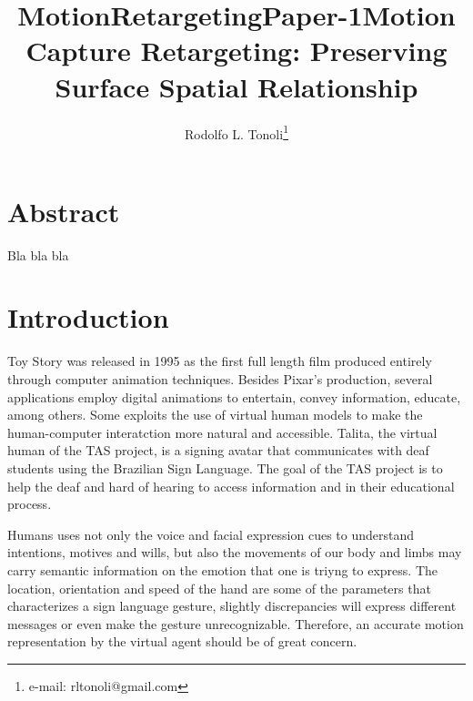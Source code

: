 \documentclass{vgtc}
\title{MotionRetargetingPaper-1}
\begin{document}
    
    
    
\author{Rodolfo L. Tonoli\thanks{e-mail: rltonoli@gmail.com}}
\title{Motion Capture Retargeting: Preserving Surface Spatial Relationship}
\maketitle

    
    

    

    \hypertarget{abstract}{%
\section{Abstract}\label{abstract}}

Bla bla bla

    \hypertarget{introduction}{%
\section{Introduction}\label{introduction}}

Toy Story was released in 1995 as the first full length film produced
entirely through computer animation techniques\cite{henne}. Besides
Pixar's production, several applications employ digital animations to
entertain, convey information, educate, among others. Some exploits the
use of virtual human models to make the human-computer interatction more
natural and accessible. Talita, the virtual human of the TAS
project\cite{demartino}, is a signing avatar that communicates with deaf
students using the Brazilian Sign Language. The goal of the TAS project
is to help the deaf and hard of hearing to access information and in
their educational process.

Humans uses not only the voice and facial expression cues to understand
intentions, motives and wills, but also the movements of our body and
limbs may carry semantic information on the emotion that one is triyng
to express. The location, orientation and speed of the hand are some of
the parameters that characterizes a sign language gesture, slightly
discrepancies will express different messages or even make the gesture
unrecognizable. Therefore, an accurate motion representation by the
virtual agent should be of great concern.
\end{document}
